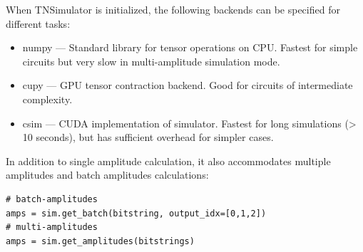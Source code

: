When TNSimulator is initialized, the following backends can be specified for different tasks:
\begin{itemize}
\item numpy --- Standard library for tensor operations on CPU. Fastest for simple circuits but very slow in multi-amplitude simulation mode.
\item cupy --- GPU tensor contraction backend. Good for circuits of intermediate complexity.
\item csim --- CUDA implementation of simulator. Fastest for long simulations (> 10 seconds), but has sufficient overhead for simpler cases.
\end{itemize}

In addition to single amplitude calculation, it also accommodates multiple amplitudes and batch amplitudes calculations:
\begin{lstlisting}
# batch-amplitudes
amps = sim.get_batch(bitstring, output_idx=[0,1,2])
# multi-amplitudes
amps = sim.get_amplitudes(bitstrings)
\end{lstlisting}

